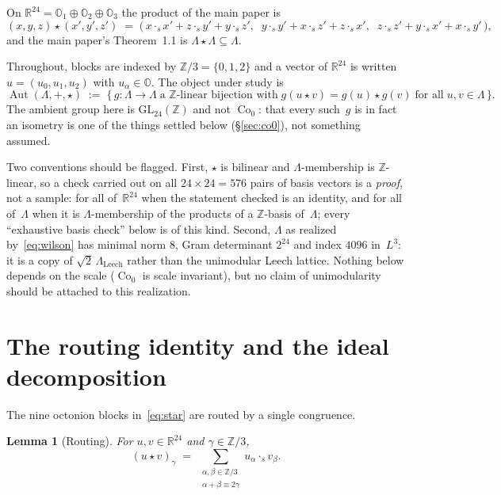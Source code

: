 \documentclass[11pt]{amsart}
\newcommand{\LL}{\Lambda}
\newcommand{\OO}{\mathbb{O}}
\newcommand{\ZZ}{\mathbb{Z}}
\newcommand{\RR}{\mathbb{R}}
\DeclareMathOperator{\Aut}{Aut}
\DeclareMathOperator{\Co}{Co}
\newtheorem{lemma}[theorem]{Lemma}
\theoremstyle{definition}
\theoremstyle{remark}
\begin{document}
On $\RR^{24} = \OO_1 \oplus \OO_2 \oplus \OO_3$ the product of the main
paper is
\begin{equation}\label{eq:star}
  (x,y,z) \star (x',y',z') \;=\;
  \bigl(\,
    x \cdot_s x' + z \cdot_s y' + y \cdot_s z',\;\;
    y \cdot_s y' + x \cdot_s z' + z \cdot_s x',\;\;
    z \cdot_s z' + y \cdot_s x' + x \cdot_s y'
  \,\bigr),
\end{equation}
and the main paper's Theorem~1.1 is $\LL \star \LL \subseteq \LL$.

Throughout, blocks are indexed by $\ZZ/3 = \{0,1,2\}$ and a vector of
$\RR^{24}$ is written $u = (u_0, u_1, u_2)$ with $u_\alpha \in \OO$. The
object under study is
\[
  \Aut(\LL, +, \star) \;:=\;
  \bigl\{\, g : \LL \to \LL \;\text{a $\ZZ$-linear bijection with}\;
    g(u \star v) = g(u) \star g(v) \;\text{for all}\; u,v \in \LL \,\bigr\}.
\]
The ambient group here is $\mathrm{GL}_{24}(\ZZ)$ and not $\Co_0$: that
every such~$g$ is in fact an isometry is one of the things settled below
(\S\ref{sec:co0}), not something assumed.

Two conventions should be flagged. First, $\star$ is bilinear and
$\LL$-membership is $\ZZ$-linear, so a check carried out on all
$24 \times 24 = 576$ pairs of basis vectors is a \emph{proof}, not a sample: for all of~$\RR^{24}$ when the
statement checked is an identity, and for all of~$\LL$ when it is
$\LL$-membership of the products of a $\ZZ$-basis of~$\LL$; every ``exhaustive basis check'' below is of
this kind. Second, $\LL$ as realized by~\eqref{eq:wilson} has minimal norm
$8$, Gram determinant $2^{24}$ and index $4096$ in~$L^3$: it is a copy of
$\sqrt2\,\LL_{\mathrm{Leech}}$ rather than the unimodular Leech lattice.
Nothing below depends on the scale ($\Co_0$ is scale invariant), but no
claim of unimodularity should be attached to this realization.

\section{The routing identity and the ideal decomposition}\label{sec:ideals}

The nine octonion blocks in~\eqref{eq:star} are routed by a single
congruence.

\begin{lemma}[Routing]\label{lem:routing}
For $u, v \in \RR^{24}$ and $\gamma \in \ZZ/3$,
\[
  (u \star v)_\gamma \;=\;
  \sum_{\substack{\alpha, \beta \in \ZZ/3 \\ \alpha + \beta \equiv 2\gamma}}
    u_\alpha \cdot_s v_\beta .
\]
\end{lemma}
\end{document}
